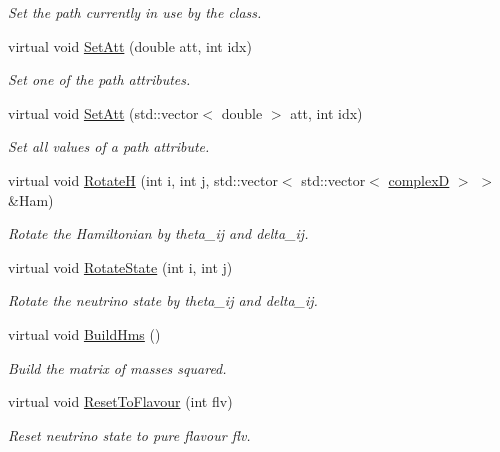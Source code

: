 \begin{DoxyCompactItemize}
\begin{DoxyCompactList}\small\item\em Set the path currently in use by the class. \end{DoxyCompactList}\item 
virtual void \hyperlink{classOscProb_1_1PMNS__Base_aba565962a440d14bee7a2a96d2eca2c5}{Set\+Att} (double att, int idx)
\begin{DoxyCompactList}\small\item\em Set one of the path attributes. \end{DoxyCompactList}\item 
virtual void \hyperlink{classOscProb_1_1PMNS__Base_aa001479b5f5828c3d16ed087f96ecbcc}{Set\+Att} (std\+::vector$<$ double $>$ att, int idx)
\begin{DoxyCompactList}\small\item\em Set all values of a path attribute. \end{DoxyCompactList}\item 
virtual void \hyperlink{classOscProb_1_1PMNS__Base_a6a3cf45bbe2349abf06708b65677c044}{RotateH} (int i, int j, std\+::vector$<$ std\+::vector$<$ \hyperlink{EigenPoint_8h_a67ca8e107e20610c3fff78d5e726ece0}{complexD} $>$ $>$ \&Ham)
\begin{DoxyCompactList}\small\item\em Rotate the Hamiltonian by theta\+\_\+ij and delta\+\_\+ij. \end{DoxyCompactList}\item 
virtual void \hyperlink{classOscProb_1_1PMNS__Base_ae52554477ad3250daa5adb8c32cab0b4}{Rotate\+State} (int i, int j)
\begin{DoxyCompactList}\small\item\em Rotate the neutrino state by theta\+\_\+ij and delta\+\_\+ij. \end{DoxyCompactList}\item 
virtual void \hyperlink{classOscProb_1_1PMNS__Base_ad0faf5eae755afb1baa1fcd5ffebad41}{Build\+Hms} ()
\begin{DoxyCompactList}\small\item\em Build the matrix of masses squared. \end{DoxyCompactList}\item 
virtual void \hyperlink{classOscProb_1_1PMNS__Base_ac0d4bf8ff1318ef96d3dafa62e0cec25}{Reset\+To\+Flavour} (int flv)
\begin{DoxyCompactList}\small\item\em Reset neutrino state to pure flavour flv. \end{DoxyCompactList}\item 

\end{DoxyCompactItemize}
